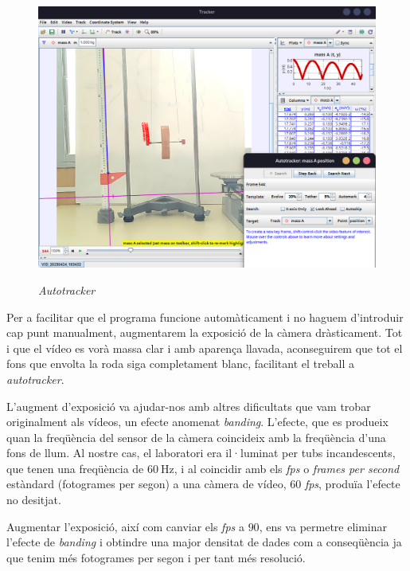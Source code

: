 \documentclass[11pt]{article}
\begin{document}
        \begin{figure}
            \vspace{-0.35cm}
            \caption{\textit{Autotracker}}
            \vspace{-0.5cm}
            \begin{center}
                \label{fig:autotracker}
                \includegraphics[width=.48\textwidth]{fotos/autotracker.png}
            \end{center}
        \end{figure}
        
        \vspace{0.4cm}Per a facilitar que el programa funcione automàticament i no haguem d'introduir cap punt manualment, augmentarem la exposició de la càmera dràsticament.  Tot i que el vídeo es vorà massa clar i amb aparença llavada, aconseguirem que tot el fons que envolta la roda siga completament blanc, facilitant el treball a \textit{autotracker}.

        \vspace{0.4cm}L'augment d'exposició va ajudar-nos amb altres dificultats que vam trobar originalment als vídeos, un efecte anomenat \textit{banding}. L'efecte, que es produeix quan la freqüència del sensor de la càmera coincideix amb la freqüència d'una fons de llum. Al nostre cas, el laboratori era il·luminat per tubs incandescents, que tenen una freqüència de $60\ \si{\hertz}$, i al coincidir amb els \textit{fps} o \textit{frames per second} estàndard (fotogrames per segon) a una càmera de vídeo, $60$ \textit{fps}, produïa l'efecte no desitjat.

        \vspace{0.4cm}Augmentar l'exposició, així com canviar els \textit{fps} a $90$, ens va permetre eliminar l'efecte de \textit{banding} i obtindre una major densitat de dades com a conseqüència ja que tenim més fotogrames per segon i per tant més resolució.
\end{document}
